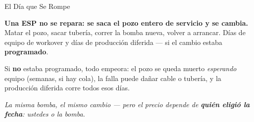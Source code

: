 \documentclass[aspectratio=169, 11pt]{beamer}
\begin{document}
\begin{frame}[shrink=8]{El Día que Se Rompe}
  \vspace{2pt}
  \begin{tcolorbox}[colback=arcaGray, colframe=arcaRed, boxrule=0pt,
    leftrule=4pt, arc=3pt, left=10pt, right=10pt, top=8pt, bottom=8pt]
    {\large\color{arcaDark}\bfseries
     Una ESP no se repara: se \textbf{saca el pozo entero de servicio}
     y se cambia.}\\[6pt]
    {\footnotesize\color{textMuted}
     Matar el pozo, sacar tubería, correr la bomba nueva, volver a
     arrancar. Días de equipo de workover y días de producción diferida
     --- si el cambio estaba \textbf{programado}.}
  \end{tcolorbox}
  \vspace{9pt}
  {\footnotesize\color{textMuted}
   Si \textbf{no} estaba programado, todo empeora: el pozo se queda muerto
   \emph{esperando} equipo (semanas, si hay cola), la falla puede dañar
   cable o tubería, y la producción diferida corre todos esos días.}
  \vspace{7pt}

  {\footnotesize\color{arcaDark}\itshape
   La misma bomba, el mismo cambio --- pero el precio depende de
   \textbf{quién eligió la fecha}: ustedes o la bomba.}
\end{frame}
\end{document}
